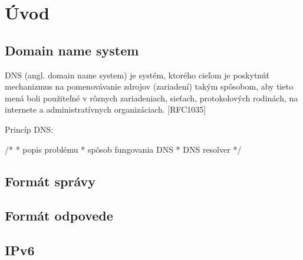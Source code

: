 
%


\newcommand*{\addNewChapter}[2][1]{\addtocounter{chapterCounter}{#1}\chapter{#2}\label{#2}}


\addNewChapter{Úvod}


\section{Domain name system}
\label{Domain name system}
DNS (angl. domain name system) je systém, ktorého cieľom je poskytnúť mechanizmus na pomenovávanie
zdrojov (zariadení) takým spôsobom, aby tieto mená boli použiteľné v rôznych zariadeniach, sieťach, protokolových rodinách, 
na internete a administratívnych organizáciach. [RFC1035]

Princíp DNS:

/*
 * popis problému
 * spôsob fungovania DNS
 * DNS resolver
 */




\section{Formát správy}
\label{Formát správy}


\section{Formát odpovede}

\section{IPv6}


